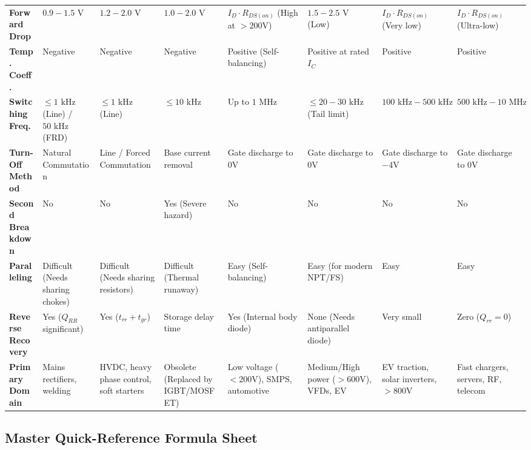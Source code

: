 \documentclass[11pt,a4paper]{article}
\begin{document}
\begin{table}[htbp]
\begin{tabularx}{\textwidth}{l p{1.6cm} p{1.6cm} p{1.6cm} p{1.8cm} p{1.8cm} p{1.8cm} X}
\textbf{Forward Drop} & $0.9 - 1.5\text{ V}$ & $1.2 - 2.0\text{ V}$ & $1.0 - 2.0\text{ V}$ & $I_D \cdot R_{DS(on)}$ (High at $>200\text{V}$) & $1.5 - 2.5\text{ V}$ (Low) & $I_D \cdot R_{DS(on)}$ (Very low) & $I_D \cdot R_{DS(on)}$ (Ultra-low) \\
\textbf{Temp. Coeff.} & Negative & Negative & Negative & Positive (Self-balancing) & Positive at rated $I_C$ & Positive & Positive \\
\textbf{Switching Freq.} & $\le 1\text{ kHz}$ (Line) / $50\text{ kHz}$ (FRD) & $\le 1\text{ kHz}$ (Line) & $\le 10\text{ kHz}$ & Up to $1\text{ MHz}$ & $\le 20-30\text{ kHz}$ (Tail limit) & $100\text{ kHz} - 500\text{ kHz}$ & $500\text{ kHz} - 10\text{ MHz}$ \\
\textbf{Turn-Off Method} & Natural Commutation & Line / Forced Commutation & Base current removal & Gate discharge to $0\text{V}$ & Gate discharge to $0\text{V}$ & Gate discharge to $-4\text{V}$ & Gate discharge to $0\text{V}$ \\
\textbf{Second Breakdown} & No & No & Yes (Severe hazard) & No & No & No & No \\
\textbf{Paralleling} & Difficult (Needs sharing chokes) & Difficult (Needs sharing resistors) & Difficult (Thermal runaway) & Easy (Self-balancing) & Easy (for modern NPT/FS) & Easy & Easy \\
\textbf{Reverse Recovery} & Yes ($Q_{RR}$ significant) & Yes ($t_{rr} + t_{gr}$) & Storage delay time & Yes (Internal body diode) & None (Needs antiparallel diode) & Very small & Zero ($Q_{rr} = 0$) \\
\textbf{Primary Domain} & Mains rectifiers, welding & HVDC, heavy phase control, soft starters & Obsolete (Replaced by IGBT/MOSFET) & Low voltage ($<200\text{V}$), SMPS, automotive & Medium/High power ($>600\text{V}$), VFDs, EV & EV traction, solar inverters, $>800\text{V}$ & Fast chargers, servers, RF, telecom \\
\bottomrule
\end{tabularx}
\end{table}

\subsection{Master Quick-Reference Formula Sheet}
\end{document}
